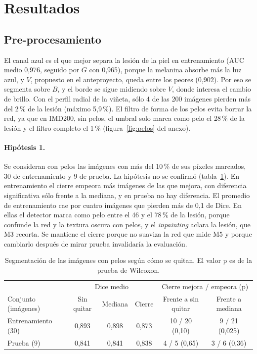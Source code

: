 \section{Resultados}
\label{sec:resultados}

\subsection{Pre-procesamiento}

El canal azul es el que mejor separa la lesión de la piel en entrenamiento (AUC medio 0,976, seguido por $G$ con 0,965), porque la melanina absorbe más la luz azul, y $V$, propuesto en el anteproyecto, queda entre los peores (0,902). Por eso se segmenta sobre $B$, y el borde se sigue midiendo sobre $V$, donde interesa el cambio de brillo. Con el perfil radial de la viñeta, sólo 4 de las 200 imágenes pierden más del 2\,\% de la lesión (máximo 5,9\,\%). El filtro de forma de los pelos evita borrar la red, ya que en IMD200, sin pelos, el umbral solo marca como pelo el 28\,\% de la lesión y el filtro completo el 1\,\% (figura~\ref{fig:pelos} del anexo).

\paragraph{Hipótesis 1.} Se consideran con pelos las imágenes con más del 10\,\% de sus píxeles marcados, 30 de entrenamiento y 9 de prueba. La hipótesis no se confirmó (tabla~\ref{tab:h1}). En entrenamiento el cierre empeora más imágenes de las que mejora, con diferencia significativa sólo frente a la mediana, y en prueba no hay diferencia. El promedio de entrenamiento cae por cuatro imágenes que pierden más de 0,1 de Dice. En ellas el detector marca como pelo entre el 46 y el 78\,\% de la lesión, porque confunde la red y la textura oscura con pelos, y el \emph{inpainting} aclara la lesión, que M3 recorta. Se mantiene el cierre porque no suaviza la red que mide M5 y porque cambiarlo después de mirar prueba invalidaría la evaluación.

\begin{table}[!htb]
  \centering\small
  \begin{tabular}{@{}lccccc@{}}
    \toprule
    & \multicolumn{3}{c}{Dice medio} & \multicolumn{2}{c}{Cierre mejora / empeora (p)} \\
    Conjunto (imágenes) & Sin quitar & Mediana & Cierre & Frente a sin quitar & Frente a mediana \\
    \midrule
    Entrenamiento (30) & 0,893 & 0,898 & 0,873 & 10 / 20 (0,10) & 9 / 21 (0,025) \\
    Prueba (9) & 0,841 & 0,841 & 0,838 & 4 / 5 (0,65) & 3 / 6 (0,36) \\
    \bottomrule
  \end{tabular}
  \caption{Segmentación de las imágenes con pelos según cómo se quitan. El valor p es de la prueba de Wilcoxon.}
  \label{tab:h1}
\end{table}

